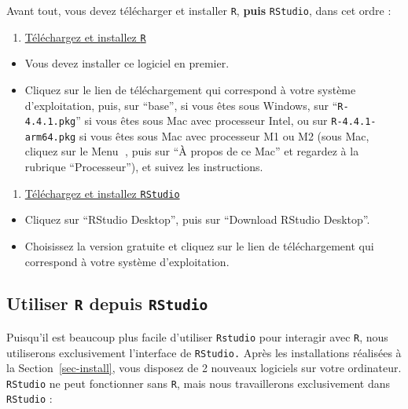 \documentclass[
  a4paper,
  DIV=11,
  numbers=noendperiod,
  oneside]{scrreprt}
\providecommand{\tightlist}{%
  \setlength{\itemsep}{0pt}\setlength{\parskip}{0pt}}\usepackage{longtable,booktabs,array}
\begin{document}
Avant tout, vous devez télécharger et installer \texttt{R},
\textbf{puis} \texttt{RStudio}, dans cet ordre :

\begin{enumerate}
\def\labelenumi{\arabic{enumi}.}
\tightlist
\item
  \href{https://cran.r-project.org}{Téléchargez et installez \texttt{R}}
\end{enumerate}

\begin{itemize}
\tightlist
\item
  Vous devez installer ce logiciel en premier.
\item
  Cliquez sur le lien de téléchargement qui correspond à votre système
  d'exploitation, puis, sur ``base'', si vous êtes sous Windows, sur
  ``\texttt{R-4.4.1.pkg}'' si vous êtes sous Mac avec processeur Intel,
  ou sur \texttt{R-4.4.1-arm64.pkg} si vous êtes sous Mac avec
  processeur M1 ou M2 (sous Mac, cliquez sur le Menu , puis sur ``À
  propos de ce Mac'' et regardez à la rubrique ``Processeur''), et
  suivez les instructions.
\end{itemize}

\begin{enumerate}
\def\labelenumi{\arabic{enumi}.}
\setcounter{enumi}{1}
\tightlist
\item
  \href{https://posit.co/download/rstudio-desktop/}{Téléchargez et
  installez \texttt{RStudio}}
\end{enumerate}

\begin{itemize}
\tightlist
\item
  Cliquez sur ``RStudio Desktop'', puis sur ``Download RStudio
  Desktop''.
\item
  Choisissez la version gratuite et cliquez sur le lien de
  téléchargement qui correspond à votre système d'exploitation.
\end{itemize}

\subsection{\texorpdfstring{Utiliser \texttt{R} depuis
\texttt{RStudio}}{Utiliser R depuis RStudio}}\label{utiliser-r-depuis-rstudio}

Puisqu'il est beaucoup plus facile d'utiliser \texttt{Rstudio} pour
interagir avec \texttt{R}, nous utiliserons exclusivement l'interface de
\texttt{RStudio.} Après les installations réalisées à la
Section~\ref{sec-install}, vous disposez de 2 nouveaux logiciels sur
votre ordinateur. \texttt{RStudio} ne peut fonctionner sans \texttt{R},
mais nous travaillerons exclusivement dans \texttt{RStudio} :
\end{document}
